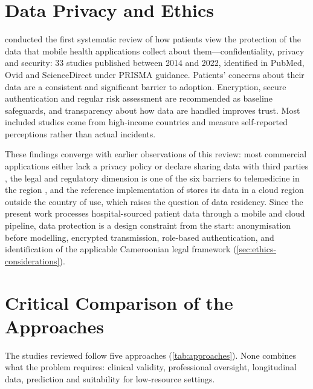 \section{Data Privacy and Ethics}\label{sec:lr-privacy}

\Textcite{alhammad2024} conducted the first systematic review of how patients view the protection of the data that mobile health applications collect about them---confidentiality, privacy and security: 33 studies published between 2014 and 2022, identified in PubMed, Ovid and ScienceDirect under PRISMA guidance. Patients' concerns about their data are a consistent and significant barrier to adoption. Encryption, secure authentication and regular risk assessment are recommended as baseline safeguards, and transparency about how data are handled improves trust. Most included studies come from high-income countries and measure self-reported perceptions rather than actual incidents.

These findings converge with earlier observations of this review: most commercial applications either lack a privacy policy or declare sharing data with third parties \parencite{alessa2019}, the legal and regulatory dimension is one of the six barriers to telemedicine in the region \parencite{dodoo2022}, and the reference implementation of \textcite{efendi2025} stores its data in a cloud region outside the country of use, which raises the question of data residency. Since the present work processes hospital-sourced patient data through a mobile and cloud pipeline, data protection is a design constraint from the start: anonymisation before modelling, encrypted transmission, role-based authentication, and identification of the applicable Cameroonian legal framework (\cref{sec:ethics-considerations}).

\section{Critical Comparison of the Approaches}\label{sec:comparison}

The studies reviewed follow five approaches (\cref{tab:approaches}). None combines what the problem requires: clinical validity, professional oversight, longitudinal data, prediction and suitability for low-resource settings.


